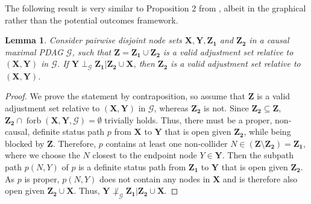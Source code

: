 \documentclass[11pt,a4paper]{article}
\newtheorem{Lemma}[Satz]{Lemma}
\theoremstyle{definition}
\theoremstyle{remark}
\DeclareMathOperator{\Forbb}{forb}
\DeclareMathOperator{\de}{de}
\newcommand{\mpdag}{maximal PDAG}
\newcommand{\g}[1][G]{\mathcal{#1}}
\newcommand{\fb}[2][X,Y]{\Forbb(\mathbf{#1},#2)}
\begin{document}
The following result is very similar to Proposition 2 from \citet{vanderweele2011new}, albeit in the graphical rather than the potential outcomes framework.

\begin{Lemma}
	\label{lemma: d-sep VAS}
	Consider pairwise disjoint node sets $\mathbf{X},\mathbf{Y},\mathbf{Z_1}$ and $\mathbf{Z_2}$ in a causal \mpdag{} $\g$, such that $\mathbf{Z} = \mathbf{Z_1} \cup \mathbf{Z_2}$ is a valid adjustment set relative to $(\mathbf{X},\mathbf{Y})$ in $\g$. If $\mathbf{Y} \perp_{\g} \mathbf{Z_1} | \mathbf{Z_2} \cup \mathbf{X}$, then $\mathbf{Z_2}$ is a valid adjustment set relative to $(\mathbf{X},\mathbf{Y})$.
\end{Lemma}

\begin{proof}
%	
	
	We prove the statement by contraposition, so assume that $\mathbf{Z}$ is a valid adjustment set relative to $(\mathbf{X}, \mathbf{Y})$ in $\g$, whereas $\mathbf{Z_2}$ is not. Since $\mathbf{Z_2} \subseteq \mathbf{Z}$, $\mathbf{Z_2} \cap \fb{\g} = \emptyset$ trivially holds. Thus, there must be a proper, non-causal, definite status path $p$ from $\mathbf{X}$ to $\mathbf{Y}$ that is open given $\mathbf{Z_2}$, while being blocked by $\mathbf{Z}$. Therefore, $p$ contains at least one non-collider $N \in (\mathbf{Z} \setminus \mathbf{Z_2}) = \mathbf{Z_1}$, where we choose the $N$ closest to the endpoint node $Y \in \mathbf{Y}$. Then the subpath path $p(N,Y)$ of $p$ is a definite status path from $\mathbf{Z_1}$ to $\mathbf{Y}$ that is open given $\mathbf{Z_2} $. As $p$ is proper, $p(N,Y)$ does not contain any nodes in $\mathbf{X}$ and is therefore also open given $\mathbf{Z_2} \cup \mathbf{X}$. Thus, $\mathbf{Y} \not\perp_{\g} \mathbf{Z_1} | \mathbf{Z_2} \cup \mathbf{X}$. 
\end{proof}



\end{document}
